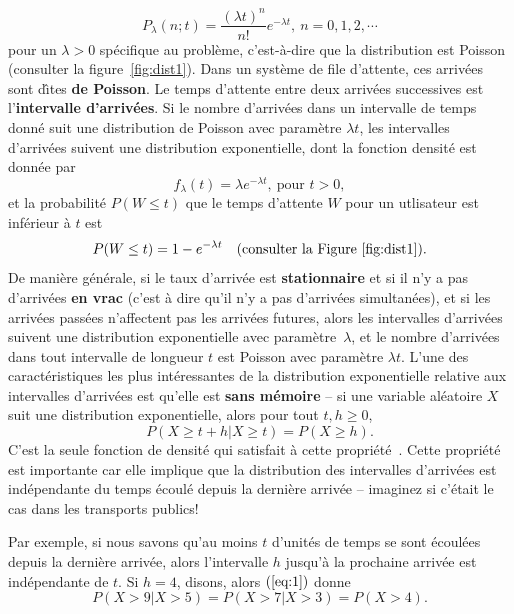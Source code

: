 $$ P_{\lambda}(n; t) = \frac{(\lambda t)^n}{n!} e^{-\lambda t}, \ n=0,1,2,\cdots$$
pour un $\lambda>0$ spécifique au problème, c'est-\`a-dire que la distribution est Poisson (consulter la figure~\ref{fig:dist1}). Dans un système de file d'attente, ces arrivées sont d\^{\i}tes \textbf{de Poisson}. \newl Le temps d’attente entre deux arrivées successives est l’\textbf{in\-ter\-val\-le d'ar\-ri\-vées}. Si le nombre d'ar\-ri\-vées dans un intervalle de temps donné suit une distribution de Poisson avec paramètre $\lambda t$, les intervalles d’arrivées suivent une distribution exponentielle, dont la fonction densit\'e est donn\'ee par 
$$ f_{\lambda}(t) = \lambda e^{-\lambda t}, \ \textrm{pour  }t>0,$$ et la probabilité $P(W\leq t)$ que le temps d'attente $W$ pour un utlisateur est inf\'erieur \`a $t$ est 
$$P(W\leq t) = 1 - e^{-\lambda t}\quad \textrm{(consulter la Figure~\ref{fig:dist1})}.$$
De manière générale, si le taux d'arrivée est \textbf{stationnaire} et si il n’y a pas d'arrivées \textbf{en vrac} (c’est à dire qu’il n’y a pas d'arrivées simultanées), et si les arrivées passées n'affectent pas les arrivées futures, alors les intervalles d’arrivées suivent une distribution exponentielle avec paramètre~$\lambda$, et le nombre d'arrivées dans tout intervalle de longueur $t$ est Poisson avec paramètre $\lambda t$.
 \newl L'une des caractéristiques les plus intéressantes de la distribution exponentielle relative aux intervalles d'arrivées est qu'elle est \textbf{sans mémoire} -- si une variable aléatoire $X$ suit une distribution exponentielle, alors pour tout $t,h\geq 0$,
\begin{equation}
P(X \geq t + h|X \geq t) = P(X \geq h). 
\label{eq:1}
\end{equation}
C'est la seule fonction de densit\'e qui satisfait \`a cette propri\'et\'e~\cite{QS_R}. Cette propriété est importante car elle implique que la distribution des intervalles d'arrivées est indépendante du temps écoulé depuis la dernière arrivée -- imaginez si c'était le cas dans  les transports publics! \par Par exemple, si nous savons qu'au moins $t$ d'unités de temps se sont écoulées depuis la dernière arrivée, alors l’intervalle $h$ jusqu'à la prochaine arrivée est indépendante de $t$. Si $h=4$, disons, alors $(\ref{eq:1})$ donne 
$$ P(X>9|X>5)= P(X>7|X>3) = P(X>4).$$

